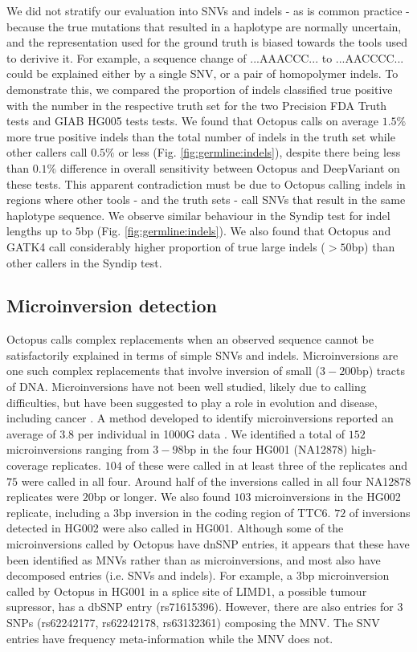 \documentclass[notitlepage, twocolumn]{article}
\begin{document}
We did not stratify our evaluation into SNVs and indels - as is common practice - because the true mutations that resulted in a haplotype are normally uncertain, and the representation used for the ground truth is biased towards the tools used to derivive it. For example, a sequence change of ...AAACCC... to ...AACCCC... could be explained either by a single SNV, or a pair of homopolymer indels. To demonstrate this, we compared the proportion of indels classified true positive with the number in the respective truth set for the two Precision FDA Truth tests and GIAB HG005 tests tests. We found that Octopus calls on average $1.5\%$ more true positive indels than the total number of indels in the truth set while other callers call $0.5\%$ or less (Fig. \ref{fig:germline:indels}), despite there being less than $0.1\%$ difference in overall sensitivity between Octopus and DeepVariant on these tests. This apparent contradiction must be due to Octopus calling indels in regions where other tools - and the truth sets - call SNVs that result in the same haplotype sequence. We observe similar behaviour in the Syndip test for indel lengths up to $5$bp (Fig. \ref{fig:germline:indels}). We also found that Octopus and GATK4 call considerably higher proportion of true large indels ($>50$bp) than other callers in the Syndip test.

\subsection*{Microinversion detection}

Octopus calls complex replacements when an observed sequence cannot be satisfactorily explained in terms of simple SNVs and indels. Microinversions are one such complex replacements that involve inversion of small ($3-200$bp) tracts of DNA. Microinversions have not been well studied, likely due to calling difficulties, but have been suggested to play a role in evolution and disease, including cancer \cite{RN561, RN560}. A method developed to identify microinversions reported an average of $3.8$ per individual in 1000G data \cite{RN560}. We identified a total of $152$ microinversions ranging from $3-98$bp in the four HG001 (NA12878) high-coverage replicates. $104$ of these were called in at least three of the replicates and $75$ were called in all four. Around half of the inversions called in all four NA12878 replicates were $20$bp or longer. We also found $103$ microinversions in the HG002 replicate, including a $3$bp inversion in the coding region of TTC6. $72$ of inversions detected in HG002 were also called in HG001. Although some of the microinversions called by Octopus have dnSNP entries, it appears that these have been identified as MNVs rather than as microinversions, and most also have decomposed entries (i.e. SNVs and indels). For example, a $3$bp microinversion called by Octopus in HG001 in a splice site of LIMD1, a possible tumour supressor, has a dbSNP entry (rs71615396). However, there are also entries for $3$ SNPs (rs62242177, rs62242178, rs63132361) composing the MNV. The SNV entries have frequency meta-information while the MNV does not.
\end{document}
